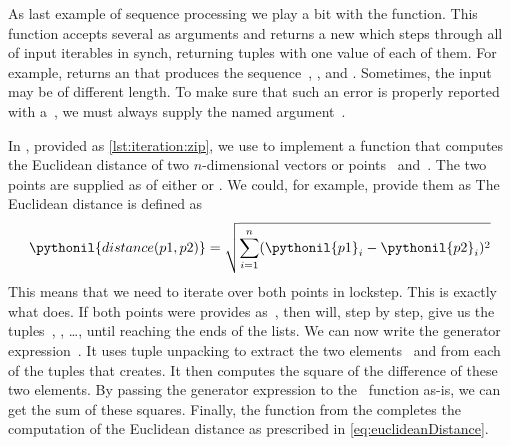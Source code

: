 %
%
%
%
%
%
\begin{sloppypar}%
As last example of sequence processing we play a bit with the  function.
This function accepts several  as arguments and returns a new  which steps through all of input iterables in synch, returning tuples with one value of each of them.
For example,  returns an  that produces the sequence~, , and .
Sometimes, the input  may be of different length.
To make sure that such an error is properly reported with a~, we must always supply the named argument~.%
\end{sloppypar}%
%
In , provided as \cref{lst:iteration:zip}, we use  to implement a function  that computes the Euclidean distance of two $n$\nobreakdashes-dimensional vectors or points~ and~.
The two points are supplied as  of either  or .
We could, for example, provide them as 
The Euclidean distance is defined as%
%
\begin{equation}%
\pythonil{distance(p1, p2)} = \sqrt{\sum_{i=1}^n (\pythonil{p1}_i - \pythonil{p2}_i)^2}%
\label{eq:euclideanDistance}%
\end{equation}%
%
This means that we need to iterate over both points in lockstep.
This is exactly what  does.
If both points were provides as~, then  will, step by step, give us the tuples~, , {\dots}, until reaching the ends of the lists.
We can now write the generator expression~.
It uses tuple unpacking to extract the two elements~ and  from each of the tuples that  creates.
It then computes the square of the difference of these two elements.
By passing the generator expression to the~ function as-is, we can get the sum of these squares.
Finally, the  function from the  completes the computation of the Euclidean distance as prescribed in \cref{eq:euclideanDistance}.

